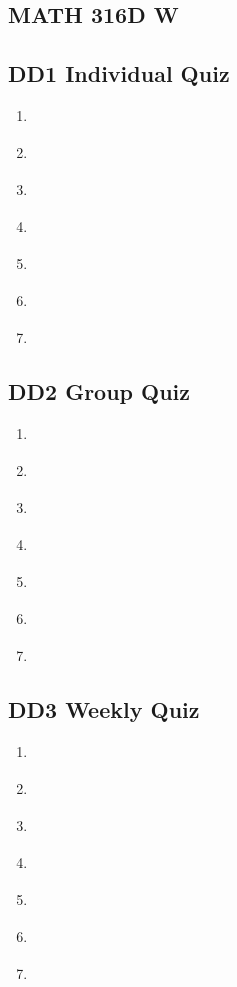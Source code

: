 \documentclass[fleqn]{article}[11pt]
\begin{document}
	
\begin{center}\section*{MATH 316D W}\end{center}
\subsection*{DD1 Individual Quiz}

\begin{enumerate}
	\item \textbf{}
	\item \textbf{}
	\item \textbf{}
	\item \textbf{}
	\item \textbf{}
	\item \textbf{}
	\item \textbf{}
\end{enumerate}

\subsection*{DD2 Group Quiz}

\begin{enumerate}
	\item \textbf{}
	\item \textbf{}
	\item \textbf{}
	\item \textbf{}
	\item \textbf{}
	\item \textbf{}
	\item \textbf{}
\end{enumerate}

\subsection*{DD3 Weekly Quiz}

\begin{enumerate}
	\item \textbf{}
	\item \textbf{}
	\item \textbf{}
	\item \textbf{}
	\item \textbf{}
	\item \textbf{}
	\item \textbf{}
\end{enumerate}
\end{document}
